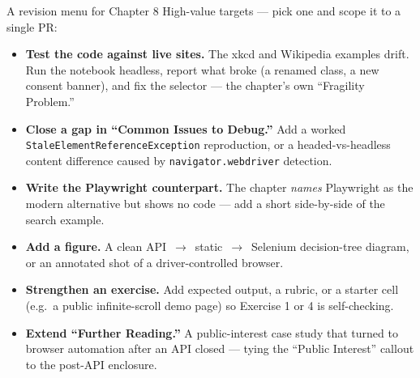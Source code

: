 \documentclass[9pt,aspectratio=169]{beamer}
\begin{document}
\begin{frame}{A revision menu for Chapter 8}
    High-value targets --- pick one and scope it to a single PR:
    \begin{itemize}
        \item \textbf{Test the code against live sites.} The xkcd and Wikipedia examples drift. Run the notebook headless, report what broke (a renamed class, a new consent banner), and fix the selector --- the chapter's own ``Fragility Problem.''
        \item \textbf{Close a gap in ``Common Issues to Debug.''} Add a worked \texttt{StaleElementReferenceException} reproduction, or a headed-vs-headless content difference caused by \texttt{navigator.webdriver} detection.
        \item \textbf{Write the Playwright counterpart.} The chapter \textit{names} Playwright as the modern alternative but shows no code --- add a short side-by-side of the search example.
        \item \textbf{Add a figure.} A clean API~$\rightarrow$~static~$\rightarrow$~Selenium decision-tree diagram, or an annotated shot of a driver-controlled browser.
        \item \textbf{Strengthen an exercise.} Add expected output, a rubric, or a starter cell (e.g.\ a public infinite-scroll demo page) so Exercise 1 or 4 is self-checking.
        \item \textbf{Extend ``Further Reading.''} A public-interest case study that turned to browser automation after an API closed --- tying the ``Public Interest'' callout to the post-API enclosure.
    \end{itemize}
\end{frame}
\end{document}
